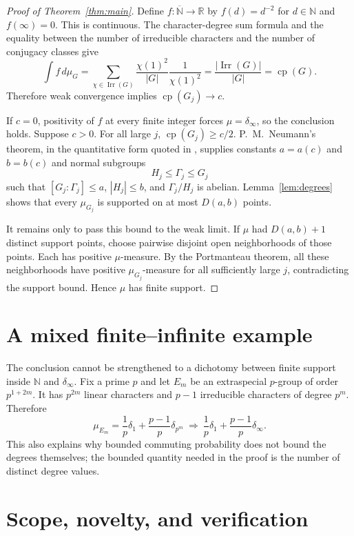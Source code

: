 \documentclass[11pt]{article}
\newcommand{\Irr}{\operatorname{Irr}}
\newcommand{\cp}{\operatorname{cp}}
\begin{document}
\begin{proof}[Proof of Theorem~\ref{thm:main}]
Define $f:\overline{\mathbb N}\to\mathbb R$ by
$f(d)=d^{-2}$ for $d\in\mathbb N$ and $f(\infty)=0$.  This is continuous.
The character-degree sum formula and the equality between the number of
irreducible characters and the number of conjugacy classes give
\[
 \int f\,d\mu_G
 =\sum_{\chi\in\Irr(G)}\frac{\chi(1)^2}{|G|}\frac1{\chi(1)^2}
 =\frac{|\Irr(G)|}{|G|}
 =\cp(G).
\]
Therefore weak convergence implies $\cp(G_j)\to c$.

If $c=0$, positivity of $f$ at every finite integer forces
$\mu=\delta_\infty$, so the conclusion holds.  Suppose $c>0$.  For all large
$j$, $\cp(G_j)\geq c/2$.  P.~M.~Neumann's theorem, in the quantitative form
quoted in \cite[Theorem~1.2]{Tointon}, supplies constants $a=a(c)$ and
$b=b(c)$ and normal subgroups
\[
 H_j\leq\Gamma_j\leq G_j
\]
such that $[G_j:\Gamma_j]\leq a$, $|H_j|\leq b$, and
$\Gamma_j/H_j$ is abelian.  Lemma~\ref{lem:degrees} shows that every
$\mu_{G_j}$ is supported on at most $D(a,b)$ points.

It remains only to pass this bound to the weak limit.  If $\mu$ had
$D(a,b)+1$ distinct support points, choose pairwise disjoint open
neighborhoods of those points.  Each has positive $\mu$-measure.  By the
Portmanteau theorem, all these neighborhoods have positive
$\mu_{G_j}$-measure for all sufficiently large $j$, contradicting the support
bound.  Hence $\mu$ has finite support.
\end{proof}

\section{A mixed finite--infinite example}

The conclusion cannot be strengthened to a dichotomy between finite support
inside $\mathbb N$ and $\delta_\infty$.  Fix a prime $p$ and let $E_m$ be an
extraspecial $p$-group of order $p^{1+2m}$.  It has $p^{2m}$ linear
characters and $p-1$ irreducible characters of degree $p^m$.  Therefore
\[
 \mu_{E_m}=\frac1p\delta_1+\frac{p-1}{p}\delta_{p^m}
 \ \Longrightarrow\ 
 \frac1p\delta_1+\frac{p-1}{p}\delta_\infty.
\]
This also explains why bounded commuting probability does not bound the
degrees themselves; the bounded quantity needed in the proof is the number
of distinct degree values.

\section{Scope, novelty, and verification}
\end{document}
